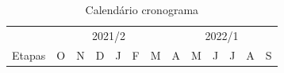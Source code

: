 \documentclass[
	12pt,				%
	openright,			%
	oneside,			%
	a4paper,			%
	brazil				%
	]{abntex2}
\begin{document}
\begin{table}[h]
\centering
	\caption{\label{tab:calendario_cronograma}Calendário cronograma}
	\begin{tabular}{|c|cccccccccccc|cccccccccccc|}
		\hline
		& \multicolumn{12}{c|}{2021/2}                                                                                                                                                                                                                                                                                                                                                                                                                                                                                                                     & \multicolumn{12}{c|}{2022/1}                                                                                                                                                                                                                                                                                                                                                                                                                                                                                                                     \\ \cline{2-25} 
		\multirow{-2}{*}{Etapas} & \multicolumn{2}{c|}{O}                                                & \multicolumn{2}{c|}{N}                                                                        & \multicolumn{2}{c|}{D}                                                                        & \multicolumn{2}{c|}{J}                                                                        & \multicolumn{2}{c|}{F}                                                                        & \multicolumn{2}{c|}{M}                                                   & \multicolumn{2}{c|}{A}                                                                        & \multicolumn{2}{c|}{M}                                                                        & \multicolumn{2}{c|}{J}                                                                        & \multicolumn{2}{c|}{J}                                                                        & \multicolumn{2}{c|}{A}                                                                        & \multicolumn{2}{c|}{S}                           \\ \hline

\end{tabular}
\end{table}
\end{document}
